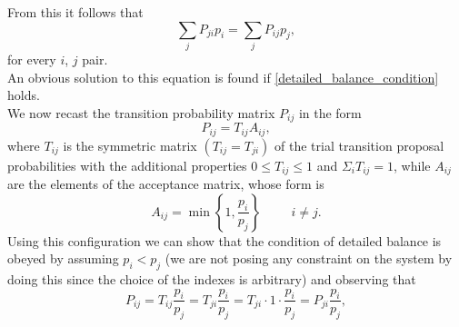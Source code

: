 From this it follows that 
\begin{equation}
    \sum_jP_{ji}p_i=\sum_jP_{ij}p_j,
\end{equation}
for every $i$, $j$ pair.\\
An obvious solution to this equation is found if \ref{detailed_balance_condition} holds.\\
We now recast the transition probability matrix $P_{ij}$ in the form
\begin{equation}
    P_{ij}=T_{ij}A_{ij},
\end{equation}
where $T_{ij}$ is the symmetric matrix $(T_{ij}=T_{ji})$ of the trial transition proposal probabilities with the additional properties 
$0\le T_{ij}\le 1$ and $\Sigma_i T_{ij}=1$, while $A_{ij}$ are the elements of the acceptance matrix, whose form is 
\begin{equation}
    A_{ij}=\min{\left\{1,\frac{p_i}{p_j}\right\}}\hspace{1cm}i\neq j.
\end{equation}
Using this configuration we can show that the condition of detailed balance is obeyed by assuming $p_i<p_j$ (we are not posing any constraint 
on the system by doing this since the choice of the indexes is arbitrary) and observing that
\begin{equation}
    P_{ij}=T_{ij}\frac{p_i}{p_j}=T_{ji}\frac{p_i}{p_j}=T_{ji}\cdot 1\cdot\frac{p_i}{p_j}=P_{ji}\frac{p_i}{p_j},
\end{equation}
